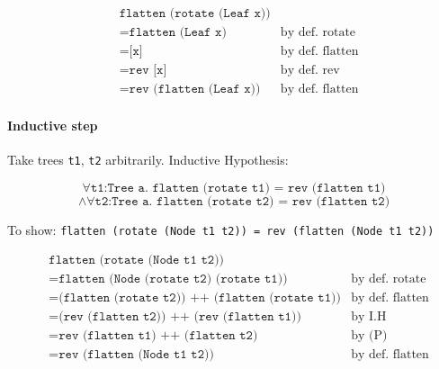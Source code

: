 \documentclass[10pt,a4paper]{article}
\newcommand{\just}[2]{\texttt{#1} & \textrm{#2}}
\begin{document}
\begin{align*}
& \texttt{flatten (rotate (Leaf x))} \\
&= \just{flatten (Leaf x)}{by def. rotate} \\
&= \just{[x]}{by def. flatten} \\
&= \just{rev [x]}{by def. rev} \\
&= \just{rev (flatten (Leaf x))}{by def. flatten}
\end{align*}

\paragraph{Inductive step}
Take trees \texttt{t1}, \texttt{t2} arbitrarily. Inductive Hypothesis:

\[ \forall \texttt{t1:Tree a. flatten (rotate t1) = rev (flatten t1)} \]
\[ \land \forall \texttt{t2:Tree a. flatten (rotate t2) = rev (flatten t2)} \]

To show: \texttt{flatten (rotate (Node t1 t2)) = rev (flatten (Node t1 t2))}

\begin{align*}
& \texttt{flatten (rotate (Node t1 t2))} \\
&= \just{flatten (Node (rotate t2) (rotate t1))}{by def. rotate} \\
&= \just{(flatten (rotate t2)) ++ (flatten (rotate t1))}{by def. flatten} \\
&= \just{(rev (flatten t2)) ++ (rev (flatten t1))}{by I.H} \\
&= \just{rev (flatten t1) ++ (flatten t2)}{by (P)} \\
&= \just{rev (flatten (Node t1 t2))}{by def. flatten}
\end{align*}
\end{document}
